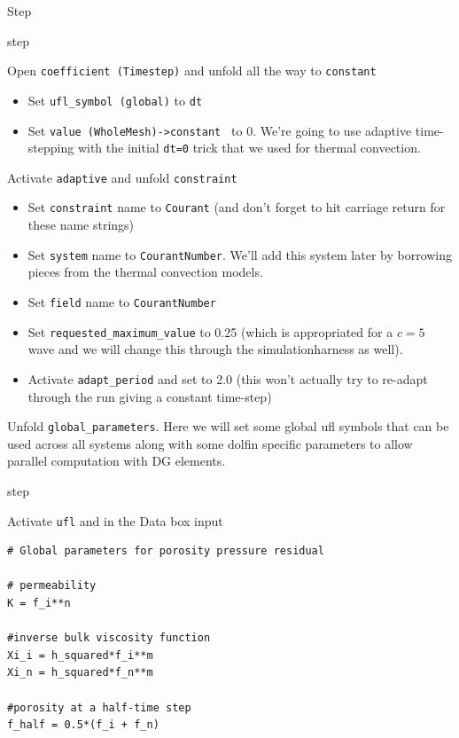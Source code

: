 \begin{steps}{Step}
\begin{steps}{step}
  \item Open \texttt{coefficient (Timestep)} and unfold all the way to \texttt{constant}
    \begin{itemize}
    \item Set \texttt{ufl\_symbol (global)} to \texttt{dt}
    \item Set \texttt{value (WholeMesh)->constant } to 0.  We're
      going to use adaptive time-stepping with the initial \texttt{dt=0} trick
      that we used for thermal convection.
    \end{itemize}
  \item Activate \texttt{adaptive} and unfold \texttt{constraint}
    \begin{itemize}
    \item Set \texttt{constraint} name to \texttt{Courant}
      (and don't forget to hit carriage return for these name strings)
    \item Set \texttt{system} name to \texttt{CourantNumber}.  We'll
      add this system later by borrowing pieces from the thermal
      convection models.
    \item Set  \texttt{field} name to \texttt{CourantNumber}
    \item Set \texttt{requested\_maximum\_value} to 0.25 (which is
      appropriated for a $c=5$ wave and we will change this through
      the simulationharness as well).
    \item Activate \texttt{adapt\_period} and set to 2.0 (this won't actually try
      to re-adapt through the run giving a constant time-step)      
    \end{itemize}
  \end{steps}
\item Unfold \texttt{global\_parameters}. Here we will set some global
  ufl symbols that can be used across all systems along with some
  dolfin specific parameters to allow parallel computation with DG elements.
  \begin{steps}{step}
  \item Activate \texttt{ufl} and in the Data box input
    \begin{lstlisting}[style=UFL]
# Global parameters for porosity pressure residual 

# permeability
K = f_i**n

#inverse bulk viscosity function
Xi_i = h_squared*f_i**m
Xi_n = h_squared*f_n**m

#porosity at a half-time step
f_half = 0.5*(f_i + f_n)


\end{lstlisting}
\end{steps}
\end{steps}
